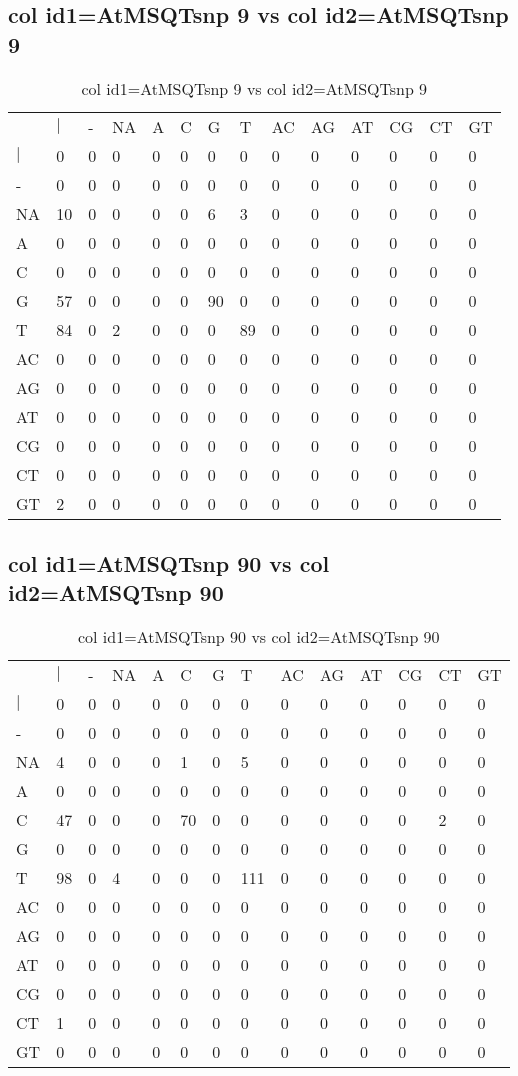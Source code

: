 \subsection{col id1=AtMSQTsnp 9 vs col id2=AtMSQTsnp 9}
\begin{center}
\begin{longtable}{|l|l|l|l|l|l|l|l|l|l|l|l|l|l|}
\caption{col id1=AtMSQTsnp 9 vs col id2=AtMSQTsnp 9} \label{table_dm976}\\
\hline
\\
\hline
&$|$&-&NA&A&C&G&T&AC&AG&AT&CG&CT&GT\\
$|$&0&0&0&0&0&0&0&0&0&0&0&0&0\\
-&0&0&0&0&0&0&0&0&0&0&0&0&0\\
NA&10&0&0&0&0&6&3&0&0&0&0&0&0\\
A&0&0&0&0&0&0&0&0&0&0&0&0&0\\
C&0&0&0&0&0&0&0&0&0&0&0&0&0\\
G&57&0&0&0&0&90&0&0&0&0&0&0&0\\
T&84&0&2&0&0&0&89&0&0&0&0&0&0\\
AC&0&0&0&0&0&0&0&0&0&0&0&0&0\\
AG&0&0&0&0&0&0&0&0&0&0&0&0&0\\
AT&0&0&0&0&0&0&0&0&0&0&0&0&0\\
CG&0&0&0&0&0&0&0&0&0&0&0&0&0\\
CT&0&0&0&0&0&0&0&0&0&0&0&0&0\\
GT&2&0&0&0&0&0&0&0&0&0&0&0&0\\
\hline
\end{longtable}
\end{center}

\subsection{col id1=AtMSQTsnp 90 vs col id2=AtMSQTsnp 90}
\begin{center}
\begin{longtable}{|l|l|l|l|l|l|l|l|l|l|l|l|l|l|}
\caption{col id1=AtMSQTsnp 90 vs col id2=AtMSQTsnp 90} \label{table_dm978}\\
\hline
\\
\hline
&$|$&-&NA&A&C&G&T&AC&AG&AT&CG&CT&GT\\
$|$&0&0&0&0&0&0&0&0&0&0&0&0&0\\
-&0&0&0&0&0&0&0&0&0&0&0&0&0\\
NA&4&0&0&0&1&0&5&0&0&0&0&0&0\\
A&0&0&0&0&0&0&0&0&0&0&0&0&0\\
C&47&0&0&0&70&0&0&0&0&0&0&2&0\\
G&0&0&0&0&0&0&0&0&0&0&0&0&0\\
T&98&0&4&0&0&0&111&0&0&0&0&0&0\\
AC&0&0&0&0&0&0&0&0&0&0&0&0&0\\
AG&0&0&0&0&0&0&0&0&0&0&0&0&0\\
AT&0&0&0&0&0&0&0&0&0&0&0&0&0\\
CG&0&0&0&0&0&0&0&0&0&0&0&0&0\\
CT&1&0&0&0&0&0&0&0&0&0&0&0&0\\
GT&0&0&0&0&0&0&0&0&0&0&0&0&0\\
\hline
\end{longtable}
\end{center}

